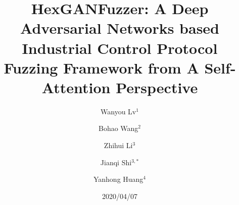 \documentclass[conference]{IEEEtran}
\begin{document}
\title{HexGANFuzzer: A Deep Adversarial Networks based Industrial Control Protocol Fuzzing Framework from A Self-Attention Perspective \\}
%
\author{Wanyou Lv$^{1}$ \and
	Bohao Wang$^{2}$ \and
	Zhihui Li$^{3}$ \and
	Jianqi Shi$^{3,*}$ \and
	Yanhong Huang$^{4}$
}



\date{2020/04/07}



\maketitle
\end{document}
